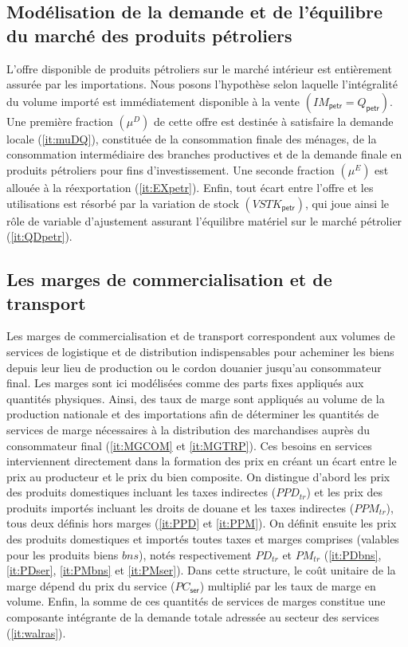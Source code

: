 \documentclass[11pt,a4paper]{article}
\newcommand{\bns}{\mathit{bns}}
\newcommand{\petr}{\mathsf{petr}}
\newcommand{\ser}{\mathsf{ser}}
\newcommand{\tr}{\mathit{tr}}
\newcommand{\IM}{\mathit{IM}}
\newcommand{\PC}{\mathit{PC}}
\newcommand{\PD}{\mathit{PD}}
\newcommand{\PM}{\mathit{PM}}
\newcommand{\PPD}{\mathit{PPD}}
\newcommand{\PPM}{\mathit{PPM}}
\newcommand{\VSTK}{\mathit{VSTK}}
\begin{document}
	\subsection{Modélisation de la demande et de l'équilibre du marché des produits pétroliers}
	
	L'offre disponible de produits pétroliers sur le marché intérieur est entièrement assurée par les importations. Nous posons l'hypothèse selon laquelle l'intégralité du volume importé est immédiatement disponible à la vente $\left(\IM_{\petr} = Q_{\petr}\right)$. Une première fraction $\left(\mu^D\right)$ de cette offre est destinée à satisfaire la demande locale (\ref{it:muDQ}), constituée de la consommation finale des ménages, de la consommation intermédiaire des branches productives et de la demande finale en produits pétroliers pour fins d'investissement. Une seconde fraction $\left(\mu^E\right)$ est allouée à la réexportation (\ref{it:EXpetr}). Enfin, tout écart entre l'offre et les utilisations est résorbé par la variation de stock $\left(\VSTK_{\petr}\right)$, qui joue ainsi le rôle de variable d'ajustement assurant l'équilibre matériel sur le marché pétrolier (\ref{it:QDpetr}).
	
	\subsection{Les marges de commercialisation et de transport}
	Les marges de commercialisation et de transport correspondent aux volumes de services de logistique et de distribution indispensables pour acheminer les biens depuis leur lieu de production ou le cordon douanier jusqu'au consommateur final. Les marges sont ici modélisées comme des parts fixes appliqués aux quantités physiques. Ainsi, des taux de marge sont appliqués au volume de la production nationale et des importations afin de déterminer les quantités de services de marge nécessaires à la distribution des marchandises auprès du consommateur final (\ref{it:MGCOM} et \ref{it:MGTRP}). Ces besoins en services interviennent directement dans la formation des prix en créant un écart entre le prix au producteur et le prix du bien composite. On distingue d'abord les prix des produits domestiques incluant les taxes indirectes ($\PPD_{tr}$) et les prix des produits importés incluant les droits de douane et les taxes indirectes ($\PPM_{tr}$), tous deux définis hors marges (\ref{it:PPD} et \ref{it:PPM}). On définit ensuite les prix des produits domestiques et importés toutes taxes et marges comprises (valables pour les produits biens $\bns$), notés respectivement $\PD_{\tr}$ et $\PM_{\tr}$ (\ref{it:PDbns}, \ref{it:PDser}, \ref{it:PMbns} et \ref{it:PMser}). Dans cette structure, le coût unitaire de la marge dépend du prix du service  ($\PC_{\ser}$) multiplié par les taux de marge en volume. Enfin, la somme de ces quantités de services de marges constitue une composante intégrante de la demande totale adressée au secteur des services (\ref{it:walras}).
	
\end{document}
